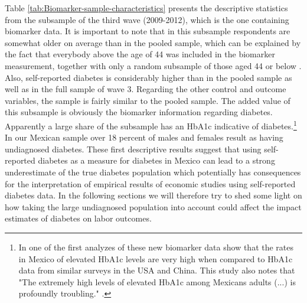 \documentclass[12pt,english,british]{article}
\begin{document}
Table \ref{tab:Biomarker-sample-characteristics} presents the descriptive statistics from the subsample of the third wave (2009-2012), which is the one containing biomarker data. It is important to note that in this subsample respondents are somewhat older on average than in the pooled sample, which can be explained by the fact that everybody above the age of 44 was included in the biomarker measurement, together with only a random subsample of those aged 44 or below \cite{Crimmins2015}. Also, self-reported diabetes is considerably higher than in the pooled sample as well as in the full sample of wave 3. Regarding the other control and outcome variables, the sample is fairly similar to the pooled sample. The added value of this subsample is obviously the biomarker information regarding diabetes. Apparently a large share of the subsample has an \ac{HbA1c} indicative of diabetes.\footnote{In one of the first analyzes of these new biomarker data \citet{Frankenberg2015} show that the rates in Mexico of elevated \ac{HbA1c} levels are very high when compared to \ac{HbA1c} data from similar surveys in the \ac{USA} and China. This study also notes that "The extremely high levels of elevated \ac{HbA1c} among Mexicans adults (...) is profoundly troubling." \citep[p.18]{Frankenberg2015}.} In our Mexican sample over 18 percent of males and females result as having undiagnosed diabetes. These first descriptive results suggest that using self-reported diabetes as a measure for diabetes in Mexico can lead to a strong underestimate of the true diabetes population which potentially has consequences for the interpretation of empirical results of economic studies using self-reported diabetes data. In the following sections we will therefore try to shed some light on how taking the large undiagnosed population into account could affect the impact estimates of diabetes on labor outcomes. 
\end{document}
